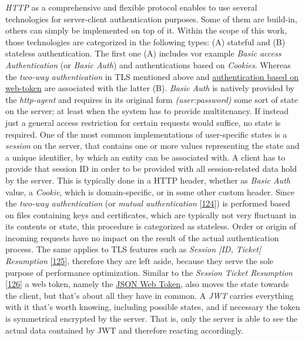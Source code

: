 \documentclass[12pt,english,a4paper,titlepage,cleardoublepage=empty,dottedtoc]{report}
\begin{document}
\emph{HTTP} as a comprehensive and flexible protocol enables to use
several technologies for server-client authentication purposes. Some of
them are build-in, others can simply be implemented on top of it. Within
the scope of this work, those technologies are categorized in the
following types: (A) stateful and (B) stateless authentication. The
first one (A) includes vor example \emph{Basic access Authentication}
(or \emph{Basic Auth}) and authentications based on \emph{Cookies}.
Whereas the \emph{two-way authentication} in TLS mentioned above and
\protect\hyperlink{def--jwt}{authentication based on web-token} are
associated with the latter (B). \emph{Basic Auth} is natively provided
by the \emph{http-agent} and requires in its original form
\emph{(user:password)} some sort of state on the server; at least when
the system has to provide multitenancy. If instead just a general access
restriction for certain requests would suffice, no state is required.
One of the most common implementations of user-specific states is a
\emph{session} on the server, that contains one or more values
representing the state and a unique identifier, by which an entity can
be associated with. A client has to provide that session ID in order to
be provided with all session-related data hold by the server. This is
typically done in a HTTP header, whether as \emph{Basic Auth} value, a
\emph{Cookie}, which is domain-specific, or in some other custom header.
Since the \emph{two-way authentication} (or \emph{mutual authentication}
{[}\protect\hyperlink{ref-web_2017_wikipedia_mutual-auth}{124}{]}) is
performed based on files containing keys and certificates, which are
typically not very fluctuant in its contents or state, this procedure is
categorized as stateless. Order or origin of incoming requests have no
impact on the result of the actual authentication process. The same
applies to TLS features such as \emph{Session {[}ID, Ticket{]}
Resumption}
{[}\protect\hyperlink{ref-book_2013_networking-101_tls-session-resumption}{125}{]},
therefore they are left aside, because they serve the sole purpose of
performance optimization. Similar to the \emph{Session Ticket
Resumption}
{[}\protect\hyperlink{ref-web_spec_tls-session-ticket-resumption}{126}{]}
a web token, namely the \protect\hyperlink{def--jwt}{JSON Web Token},
also moves the state towards the client, but that's about all they have
in common. A \emph{JWT} carries everything with it that's worth knowing,
including possible states, and if necessary the token is symmetrical
encrypted by the server. That is, only the server is able to see the
actual data contained by JWT and therefore reacting accordingly.
\end{document}

